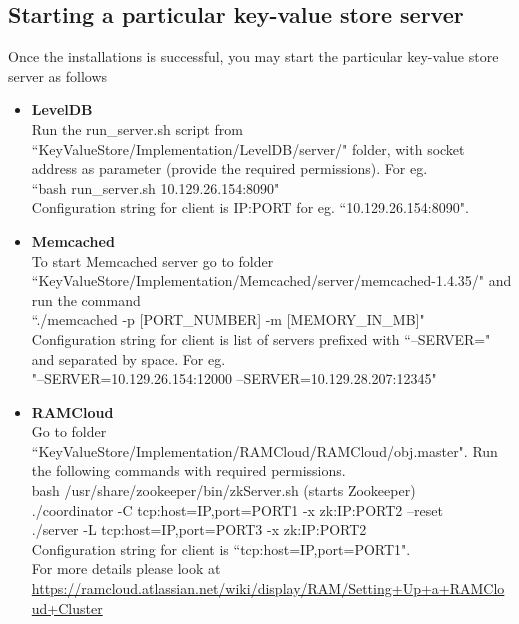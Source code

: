 \documentclass[11pt]{article}
\begin{document}
\subsection{Starting a particular key-value store server}
Once the installations is successful, you may start the particular key-value store server as follows
\begin{itemize}
\item \textbf{LevelDB}\\
Run the run\_server.sh script from  ``KeyValueStore/Implementation/LevelDB/server/" folder, with socket address as parameter (provide the required permissions). For eg.\\
``bash run\_server.sh 10.129.26.154:8090"\\
Configuration string for client is IP:PORT for eg. ``10.129.26.154:8090".

\item \textbf{Memcached}\\
To start Memcached server go to folder\\
``KeyValueStore/Implementation/Memcached/server/memcached-1.4.35/" and run the command \\
``./memcached -p [PORT\_NUMBER] -m [MEMORY\_IN\_MB]"\\
Configuration string for client is list of servers prefixed with ``--SERVER=" and separated by space. For eg.\\
"--SERVER=10.129.26.154:12000 --SERVER=10.129.28.207:12345"


\item \textbf{RAMCloud}\\
Go to folder ``KeyValueStore/Implementation/RAMCloud/RAMCloud/obj.master".
Run the following commands with required permissions.\\
bash /usr/share/zookeeper/bin/zkServer.sh (starts Zookeeper)\\
./coordinator -C tcp:host=IP,port=PORT1 -x zk:IP:PORT2 --reset\\
./server -L tcp:host=IP,port=PORT3 -x zk:IP:PORT2\\
Configuration string for client is ``tcp:host=IP,port=PORT1".\\
For more details please look at\\
\href{https://ramcloud.atlassian.net/wiki/display/RAM/Setting+Up+a+RAMCloud+Cluster}{https://ramcloud.atlassian.net/wiki/display/RAM/Setting+Up+a+RAMCloud+Cluster}


\end{itemize}
\end{document}
